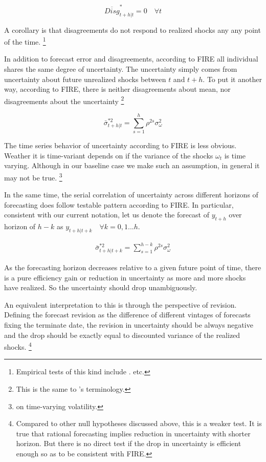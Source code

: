 \documentclass[]{article}
\begin{document}
	$$\overline{Disg}^{*}_{t+h|t}=0 \quad \forall t$$
	
	A corollary is that disagreements do not respond to realized shocks any any point of the time.  \footnote{Empirical tests of this kind include \citet{xx}.\citet{xx} etc. }
	
	In addition to forecast error and disagreements, according to FIRE all individual shares the same degree of uncertainty. The uncertainty simply comes from uncertainty about future unrealized shocks between $t$ and $t+h$. To put it another way, according to FIRE, there is neither disagreements about mean, nor disagreements about the uncertainty \footnote{This is the same to \citet{}'s terminology.} 
	
	$$\bar \sigma^{*2}_{t+h|t} = \sum^{h}_{s=1}\rho^{2s} \sigma^2_{\omega}$$
	
	The time series behavior of uncertainty according to FIRE is less obvious. Weather it is time-variant depends on if the variance of the shocks $\omega_t$ is time varying. Although in our baseline case we make such an assumption, in general it may not be true. \footnote{\citet{xx} on time-varying volatility.}
	
	In the same time, the serial correlation of uncertainty across different horizons of forecasting does follow testable pattern according to FIRE. In particular, consistent with our current notation, let us denote the forecast of $y_{t+h}$ over horizon of $h-k$ as $y_{t+h|t+k} \quad \forall k =0,1...h$. 
	
	\begin{eqnarray}\label{VarREPop}
		\bar \sigma^{*2}_{t+h|t+k} = \sum^{h-k}_{s=1}\rho^{2s} \sigma^2_{\omega}
	\end{eqnarray}
	
	As the forecasting horizon decreases relative to a given future point of time, there is a pure efficiency gain or reduction in uncertainty as more and more shocks have realized. So the uncertainty should drop unambiguously. 
	
	An equivalent interpretation to this is through the perspective of revision. Defining the forecast revision as the difference of different vintages of forecasts fixing the terminate date, the revision in uncertainty should be always negative and the drop should be exactly equal to discounted variance of the realized shocks. \footnote{Compared to other null hypotheses discussed above, this is a weaker test. It is true that rational forecasting implies reduction in uncertainty with shorter horizon. But there is no direct test if the drop in uncertainty is efficient enough so as to be consistent with FIRE. }
	
\end{document}
